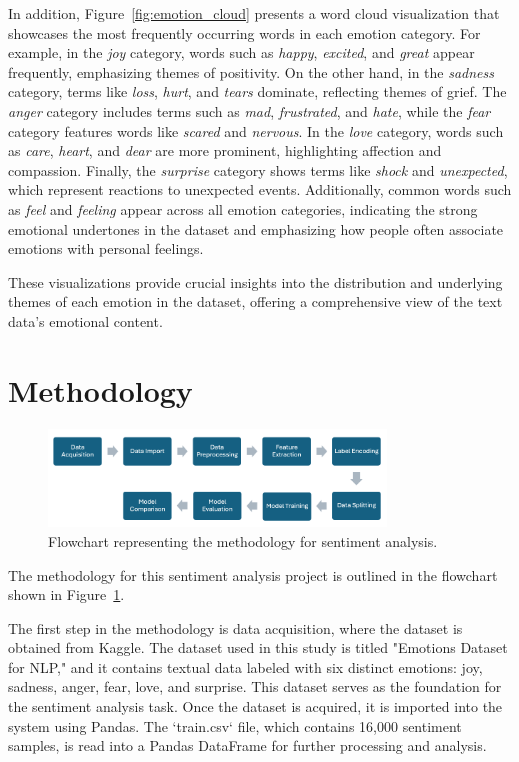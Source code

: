 In addition, Figure~\ref{fig:emotion_cloud} presents a word cloud visualization that showcases the most frequently occurring words in each emotion category. For example, in the \textit{joy} category, words such as \textit{happy}, \textit{excited}, and \textit{great} appear frequently, emphasizing themes of positivity. On the other hand, in the \textit{sadness} category, terms like \textit{loss}, \textit{hurt}, and \textit{tears} dominate, reflecting themes of grief. The \textit{anger} category includes terms such as \textit{mad}, \textit{frustrated}, and \textit{hate}, while the \textit{fear} category features words like \textit{scared} and \textit{nervous}. In the \textit{love} category, words such as \textit{care}, \textit{heart}, and \textit{dear} are more prominent, highlighting affection and compassion. Finally, the \textit{surprise} category shows terms like \textit{shock} and \textit{unexpected}, which represent reactions to unexpected events. Additionally, common words such as \textit{feel} and \textit{feeling} appear across all emotion categories, indicating the strong emotional undertones in the dataset and emphasizing how people often associate emotions with personal feelings.

These visualizations provide crucial insights into the distribution and underlying themes of each emotion in the dataset, offering a comprehensive view of the text data's emotional content.

\section{Methodology}

\begin{figure}[H]
    \centering
    \includegraphics[width=0.8\textwidth]{methodology_flow.png}
    \caption{Flowchart representing the methodology for sentiment analysis.}
    \label{fig:methodology_flow}
\end{figure}

The methodology for this sentiment analysis project is outlined in the flowchart shown in Figure~\ref{fig:methodology_flow}.

The first step in the methodology is data acquisition, where the dataset is obtained from Kaggle. The dataset used in this study is titled "Emotions Dataset for NLP," and it contains textual data labeled with six distinct emotions: joy, sadness, anger, fear, love, and surprise. This dataset serves as the foundation for the sentiment analysis task. Once the dataset is acquired, it is imported into the system using Pandas. The `train.csv` file, which contains 16,000 sentiment samples, is read into a Pandas DataFrame for further processing and analysis.

